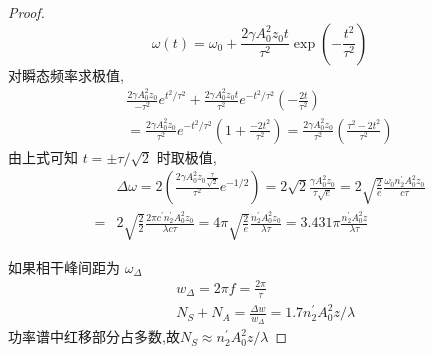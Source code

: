 \begin{proof}
$$
\omega(t)=\omega_{0}+\frac{2 \gamma A_{0}^{2} z_{0} t}{\tau^{2}} \exp \left(-\frac{t^{2}}{\tau^{2}}\right)
$$
对瞬态频率求极值,
$$
\begin{array}{l}
{\frac{2 \gamma A_{0}^2 z_{0}}{-\tau^{2}}e^{t^{2}/\tau^2}+\frac{2 \gamma A_{0}^{2} z_{0} t}{\tau^{2}} e^{-t^{2} / \tau^{2}}\left(-\frac{2 t}{\tau^{2}}\right)} \\
{=\frac{2 \gamma A_{0}^{2} z_{0}}{\tau^{2}} e^{-t^{2} / \tau^{2}}\left(1+\frac{-2 t^{2}}{\tau^{2}}\right)=\frac{2 \gamma A_{0}^{2} z_{0}}{\tau^{2}}\left(\frac{\tau^{2} -2t^{2}}{\tau^{2}}\right)}
\end{array}
$$
由上式可知 $t=\pm \tau/\sqrt{2}$ 时取极值,
$$
\begin{aligned}
& \Delta \omega=2\left(\frac{2 \gamma A_0^{2} z_{0} \frac{\tau}{\sqrt{2}}}{\tau^{2}} e^{-1 / 2}\right)=2 \sqrt{2} \frac{\gamma A_{0}^{2} z_{0}}{\tau \sqrt{e}}=2 \sqrt{\frac{2}{e}} \frac{\omega_{0} n_{2}^{\prime} A_{0}^{2} z_{0}}{c \tau} \\
=& 2 \sqrt{\frac{2}{2}} \frac{2 \pi c^{\prime} n_{2}^{\prime} A_{0}^{2} z_{0}}{\lambda c \tau}=4 \pi \sqrt{\frac{2}{e}} \frac{n_{2}^{\prime} A_{0}^{2} z_{0}}{\lambda \tau}=3.431 \pi \frac{n_{2}^{\prime} A_{0}^{2} z}{\lambda \tau}
\end{aligned}
$$

如果相干峰间距为 $\omega_\Delta$
$$
\begin{aligned}
&w_{\Delta}=2 \pi f=\frac{2 \pi}{\tau}\\
&N_S+N_A=\frac{\Delta w}{w_{\Delta}} = 1.7 n_{2}^{\prime} A_{0}^{2} z / \lambda 
\end{aligned}
$$
功率谱中红移部分占多数,故$N_S\approx n_{2}^{\prime} A_{0}^{2} z / \lambda $
\end{proof}